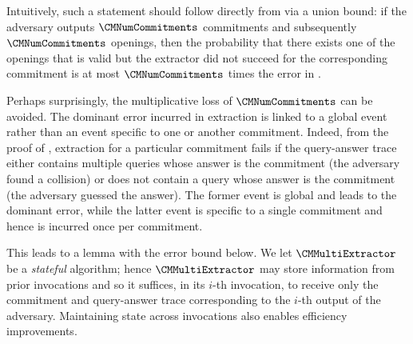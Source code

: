 Intuitively, such a statement should follow directly from  via a union bound: if the adversary outputs $\CMNumCommitments$ commitments and subsequently $\CMNumCommitments$ openings, then the probability that there exists one of the openings that is valid but the extractor did not succeed for the corresponding commitment is at most $\CMNumCommitments$ times the error in .

Perhaps surprisingly, the multiplicative loss of $\CMNumCommitments$ can be avoided. The dominant error incurred in extraction is linked to a global event rather than an event specific to one or another commitment. Indeed, from the proof of , extraction for a particular commitment fails if the query-answer trace either contains multiple queries whose answer is the commitment (the adversary found a collision) or does not contain a query whose answer is the commitment (the adversary guessed the answer). The former event is global and leads to the dominant error, while the latter event is specific to a single commitment and hence is incurred once per commitment.

This leads to a lemma with the error bound below. We let $\CMMultiExtractor$ be a \emph{stateful} algorithm; hence $\CMMultiExtractor$ may store information from prior invocations and so it suffices, in its $i$-th invocation, to receive only the commitment and query-answer trace corresponding to the $i$-th output of the adversary. Maintaining state across invocations also enables efficiency improvements.

